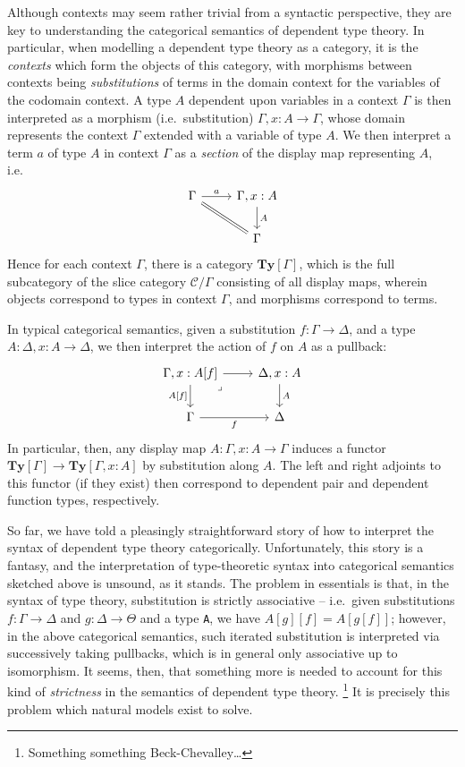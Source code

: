 \documentclass[
  11pt,
  oneside,
  article]{memoir}
\theoremstyle{definition}
\theoremstyle{plain}
\newcommand{\0}{\textsf{0}}
\newcommand{\1}{\tn{\textsf{1}}}
\begin{document}
Although contexts may seem rather trivial from a syntactic perspective,
they are key to understanding the categorical semantics of dependent
type theory. In particular, when modelling a dependent type theory as a
category, it is the \emph{contexts} which form the objects of this
category, with morphisms between contexts being \emph{substitutions} of
terms in the domain context for the variables of the codomain context. A
type \(A\) dependent upon variables in a context \(\Gamma\) is then
interpreted as a morphism (i.e.~substitution)
\(\Gamma, x : A \to \Gamma\), whose domain represents the context
\(\Gamma\) extended with a variable of type \(A\). We then interpret a
term \(a\) of type \(A\) in context \(\Gamma\) as a \emph{section} of
the display map representing \(A\), i.e.~\[
\begin{tikzcd}
    \Gamma & {\Gamma, x : A} \\
    & \Gamma
    \arrow["a", from=1-1, to=1-2]
    \arrow[Rightarrow, no head, from=1-1, to=2-2]
    \arrow["A", from=1-2, to=2-2]
\end{tikzcd}
\] Hence for each context \(\Gamma\), there is a category
\(\mathbf{Ty}[\Gamma]\), which is the full subcategory of the slice
category \(\mathcal{C}/\Gamma\) consisting of all display maps, wherein
objects correspond to types in context \(\Gamma\), and morphisms
correspond to terms.

In typical categorical semantics, given a substitution
\(f : \Gamma \to \Delta\), and a type \(A : \Delta, x : A \to \Delta\),
we then interpret the action of \(f\) on \(A\) as a pullback: \[
\begin{tikzcd}
    {\Gamma, x : A[f]} & {\Delta, x : A} \\
    \Gamma & \Delta
    \arrow[from=1-1, to=1-2]
    \arrow["{A[f]}"', from=1-1, to=2-1]
    \arrow["\lrcorner"{anchor=center, pos=0.125}, draw=none, from=1-1, to=2-2]
    \arrow["A", from=1-2, to=2-2]
    \arrow["f"', from=2-1, to=2-2]
\end{tikzcd}
\] In particular, then, any display map \(A : \Gamma, x : A \to \Gamma\)
induces a functor \(\mathbf{Ty}[\Gamma] \to \mathbf{Ty}[\Gamma, x : A]\)
by substitution along \(A\). The left and right adjoints to this functor
(if they exist) then correspond to dependent pair and dependent function
types, respectively.

So far, we have told a pleasingly straightforward story of how to
interpret the syntax of dependent type theory categorically.
Unfortunately, this story is a fantasy, and the interpretation of
type-theoretic syntax into categorical semantics sketched above is
unsound, as it stands. The problem in essentials is that, in the syntax
of type theory, substitution is strictly associative -- i.e.~given
substitutions \(f : \Gamma \to \Delta\) and \(g : \Delta \to \Theta\)
and a type \texttt{A}, we have \(A[g][f] = A[g[f]]\); however, in the
above categorical semantics, such iterated substitution is interpreted
via successively taking pullbacks, which is in general only associative
up to isomorphism. It seems, then, that something more is needed to
account for this kind of \emph{strictness} in the semantics of dependent
type theory.%
\footnote{Something something Beck-Chevalley\ldots{}} 
It is precisely this problem which natural models exist to solve.
\end{document}
